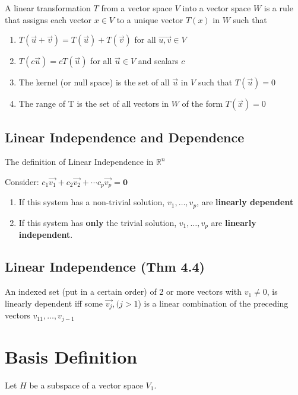 A linear transformation $T$ from a vector space $V$ into a vector space $W$ is a rule that assigns each vector $x\in V$ to a unique vector $T(x)$ in $W$ such that 

\begin{enumerate}
\item $T(\vec{u}+\vec{v})=T(\vec{u})+T(\vec{v})$ for all $\vec{u,v}\in V$
	\item $T(c\vec{u})=cT(\vec{u})$ for all $\vec{u}\in V$ and scalars $c$
	\item The kernel (or null space) is the set of all $\vec{u}$ in $V$ such that $T(\vec{u})=0$
	\item The range of T is the set of all vectors in $W$ of the form $T(\vec{x})=0$
\end{enumerate}

\subsection{Linear Independence and Dependence}


The definition of Linear Independence in $ \mathbb{R}^{n} $ 


Consider: $c_{1}\vec{v_{1}}+c_{2}\vec{v_{2}}+ \cdots c_{p}\vec{v_{p}}=\textbf{0}$

\begin{enumerate}
	\item If this system has a non-trivial solution, $v_{1},\ldots,v_{p}$, are \textbf{linearly dependent}
	\item If this system has \textbf{only} the trivial solution, $v_{1},\ldots,v_{p}$ are \textbf{linearly independent}.
		
\end{enumerate}

\subsection{Linear Independence (Thm 4.4)}
An indexed set (put in a certain order) of 2 or more vectors with $v_{1} \neq0$, is linearly dependent iff some $\vec{v_{j}},(j>1$) is a linear combination of the preceding vectors $v_{11},\ldots,v_{j-1}$


\section{Basis Definition}



Let $H$ be a subspace of a vector space $V_{1}$. 

